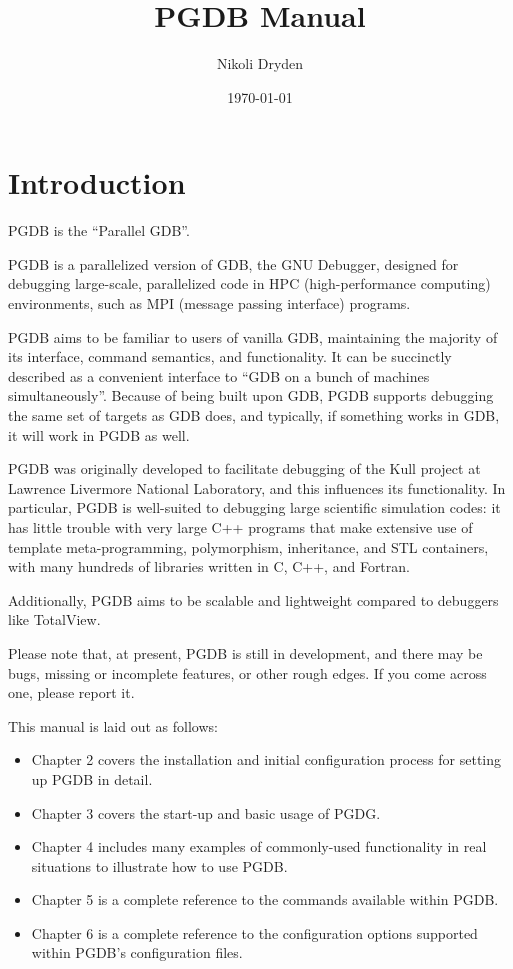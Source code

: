 \documentclass{refart}
\title{PGDB Manual}
\author{Nikoli Dryden}
\date{\today}
\begin{document}
\maketitle

\newpage

\setcounter{page}{1}
\tableofcontents

\newpage

\setcounter{page}{1}

\section{Introduction}

PGDB is the ``Parallel GDB''.

PGDB is a parallelized version of GDB, the GNU Debugger, designed for debugging large-scale, parallelized code in HPC (high-performance computing) environments, such as MPI (message passing interface) programs.

PGDB aims to be familiar to users of vanilla GDB, maintaining the majority of its interface, command semantics, and functionality. It can be succinctly described as a convenient interface to ``GDB on a bunch of machines simultaneously''. Because of being built upon GDB, PGDB supports debugging the same set of targets as GDB does, and typically, if something works in GDB, it will work in PGDB as well.

PGDB was originally developed to facilitate debugging of the Kull project at Lawrence Livermore National Laboratory, and this influences its functionality. In particular, PGDB is well-suited to debugging large scientific simulation codes: it has little trouble with very large C++ programs that make extensive use of template meta-programming, polymorphism, inheritance, and STL containers, with many hundreds of libraries written in C, C++, and Fortran.

Additionally, PGDB aims to be scalable and lightweight compared to debuggers like TotalView.

Please note that, at present, PGDB is still in development, and there may be bugs, missing or incomplete features, or other rough edges. If you come across one, please report it.

This manual is laid out as follows:

\begin{itemize}
\item Chapter 2 covers the installation and initial configuration process for setting up PGDB in detail.
\item Chapter 3 covers the start-up and basic usage of PGDG.
\item Chapter 4 includes many examples of commonly-used functionality in real situations to illustrate how to use PGDB.
\item Chapter 5 is a complete reference to the commands available within PGDB.
\item Chapter 6 is a complete reference to the configuration options supported within PGDB's configuration files.
\end{itemize}
\end{document}
